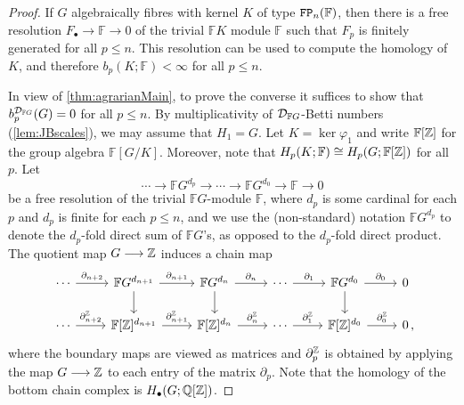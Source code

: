 \documentclass[11pt, letterpaper]{amsart}
\begin{document}
\begin{proof}
    If $G$ algebraically fibres with kernel $K$ of type $\mathtt{FP}_n(\mathbb F)$, then there is a free resolution $F_\bullet \longrightarrow \mathbb F \longrightarrow 0$ of the trivial $\mathbb F K$ module $\mathbb F$ such that $F_p$ is finitely generated for all $p \leqslant n$. This resolution can be used to compute the homology of $K$, and therefore $b_p(K; \mathbb F) < \infty$ for all $p \leqslant n$.
    
    In view of \cref{thm:agrarianMain}, to prove the converse it suffices to show that $b_p^{\mathcal{D}_{\mathbb F{G}}}(G) = 0$ for all $p \leqslant n$. By multiplicativity of $\mathcal{D}_{\mathbb F{G}}$-Betti numbers (\cref{lem:JBscales}), we may assume that $H_1 = G$. Let $K = \ker \varphi_1$ and write $\mathbb F[\mathbb{Z}]$ for the group algebra $\mathbb F[G/K]$. Moreover, note that $H_p(K;\mathbb F) \cong H_p(G; \mathbb F[\mathbb{Z}])$ for all $p$. Let
    \[
        \cdots \longrightarrow \mathbb F G^{d_p} \longrightarrow \cdots \longrightarrow \mathbb F G^{d_0} \longrightarrow \mathbb F \longrightarrow 0
    \]
    be a free resolution of the trivial $\mathbb F G$-module $\mathbb F$, where $d_p$ is some cardinal for each $p$ and $d_p$ is finite for each $p \leqslant n$, and we use the (non-standard) notation $\mathbb F G^{d_p}$ to denote the $d_p$-fold direct sum of $\mathbb F G$'s, as opposed to the $d_p$-fold direct product. The quotient map $G \longrightarrow \mathbb{Z}$ induces a chain map
    \[
        \begin{tikzcd}
        \cdots \arrow[r, "\partial_{n+2}"]    & \mathbb F G^{d_{n+1}} \arrow[r, "\partial_{n+1}"] \arrow[d] & \mathbb F G^{d_n} \arrow[r, "\partial_n"] \arrow[d] & \cdots \arrow[r, "\partial_1"]    & \mathbb F G^{d_0} \arrow[r, "\partial_0"] \arrow[d] & 0 \\
        \cdots \arrow[r, "\partial_{n+2}^\Z"] & {\mathbb F[\Z]^{d_{n+1}}} \arrow[r, "\partial_{n+1}^\Z"]        & \mathbb F[\Z]^{d_n} \arrow[r, "\partial_n^\Z"]    & \cdots \arrow[r, "\partial_1^\Z"] & {\mathbb F[\Z]^{d_0}} \arrow[r, "\partial_0^\Z"]    & 0\nospacepunct{,}
    \end{tikzcd}
    \]
    where the boundary maps are viewed as matrices and $\partial_p^{\mathbb{Z}}$ is obtained by applying the map $G \longrightarrow \mathbb{Z}$ to each entry of the matrix $\partial_p$. Note that the homology of the bottom chain complex is $H_\bullet(G;\mathbb{Q}[\mathbb{Z}])$.
    

\end{proof}
\end{document}
